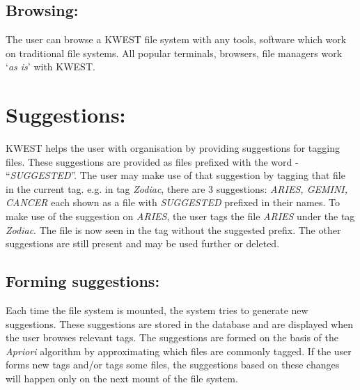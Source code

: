 \subsection{Browsing:} 
The user can browse a KWEST file system with any tools, software which work on traditional file systems. All popular terminals, browsers, file managers work `\textit{as is}' with KWEST. 


\section{Suggestions:}
KWEST helps the user with organisation by providing suggestions for tagging files. These suggestions are provided as files prefixed with the word - ``\textit{SUGGESTED}''. The user may make use of that suggestion by tagging that file in the current tag. \newline
e.g. in tag \textit{Zodiac}, there are 3 suggestions: \textit{ARIES, GEMINI, CANCER} each shown as a file with \textit{SUGGESTED} prefixed in their names. To make use of the suggestion on \textit{ARIES}, the user tags the file \textit{ARIES} under the tag \textit{Zodiac}. The file is now seen in the tag without the suggested prefix. The other suggestions are still present and may be used further or deleted.

\subsection*{Forming suggestions:}
Each time the file system is mounted, the system tries to generate new suggestions. These suggestions are stored in the database and are displayed when the user browses relevant tags. The suggestions are formed on the basis of the \textit{Apriori} algorithm by approximating which files are commonly tagged. If the user forms new tags and/or tags some files, the suggestions based on these changes will happen only on the next mount of the file system.


